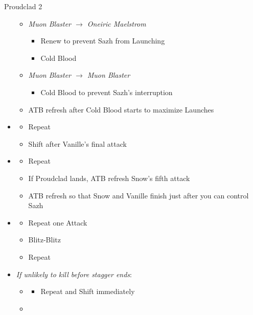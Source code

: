 \begin{battle}{Proudclad 2}
\begin{multicols}{2}
\begin{itemize}
\begin{itemize}
        \item \textit{Muon Blaster $\rightarrow$ Oneiric Maelstrom}
        \begin{itemize}
            \item Renew to prevent Sazh from Launching
            \item Cold Blood
        \end{itemize}
        \item \textit{Muon Blaster $\rightarrow$ Muon Blaster}
        \begin{itemize}
            \item Cold Blood to prevent Sazh's interruption
        \end{itemize}
        \item ATB refresh after Cold Blood starts to maximize Launches
    \end{itemize}
    \item \fifth
    \begin{itemize}
        \item Repeat
        \item Shift after Vanille's final attack
    \end{itemize}
    \item \first
    \begin{itemize}
        \item Repeat
        \item If Proudclad lands, ATB refresh Snow's fifth attack
        \item ATB refresh so that Snow and Vanille finish just after you can control Sazh
    \end{itemize}
    \item \second
    \begin{itemize}
        \item Repeat one Attack
        \item Blitz-Blitz
        \item Repeat
    \end{itemize}
    \columnbreak
    \item \textit{If unlikely to kill before stagger ends}:
    \begin{itemize}
        \item \first
        \begin{itemize}
            \item Repeat and Shift immediately
        \end{itemize}
        \item \second
        \begin{itemize}

\end{itemize}
\end{itemize}
\end{itemize}
\end{multicols}
\end{battle}

